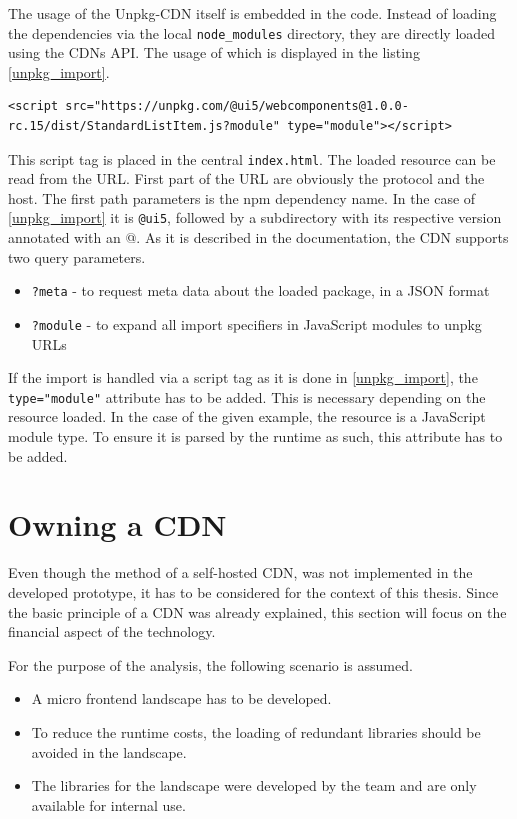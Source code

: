 The usage of the Unpkg-CDN itself is embedded in the code. Instead of loading the dependencies via the local \texttt{node\_modules} directory, they are directly loaded using the CDNs API. The usage of which is displayed in the listing \ref{unpkg_import}.

\begin{lstlisting}[caption=Import of a dependecy using the unpkg API, label=unpkg_import]
	<script src="https://unpkg.com/@ui5/webcomponents@1.0.0-rc.15/dist/StandardListItem.js?module" type="module"></script>
\end{lstlisting}

This script tag is placed in the central \texttt{index.html}. The loaded resource can be read from the URL. First part of the URL are obviously the protocol and the host. The first path parameters is the npm dependency name. In the case of \ref{unpkg_import} it is \texttt{@ui5}, followed by a subdirectory with its respective version annotated with an @.
As it is described in the documentation, the CDN supports two query parameters.

\begin{itemize}[noitemsep]
	\item \texttt{?meta} - to request meta data about the loaded package, in a JSON format
	\item \texttt{?module} - to expand all import specifiers in JavaScript modules to unpkg URLs
\end{itemize}

If the import is handled via a script tag as it is done in \ref{unpkg_import}, the \texttt{type="module"} attribute has to be added. This is necessary depending on the resource loaded.
In the case of the given example, the resource is a JavaScript module type. To ensure it is parsed by the runtime as such, this attribute has to be added.\cite{js_module_type}

\section{Owning a CDN}

Even though the method of a self-hosted CDN, was not implemented in the developed prototype, it has to be considered for the context of this thesis. Since the basic principle of a CDN was already explained, this section will focus on the financial aspect of the technology.

For the purpose of the analysis, the following scenario is assumed.

\begin{itemize}[noitemsep]
	\item A micro frontend landscape has to be developed. 
	\item To reduce the runtime costs, the loading of redundant libraries should be avoided in the landscape.
	\item The libraries for the landscape were developed by the team and are only available for internal use.
\end{itemize} 

